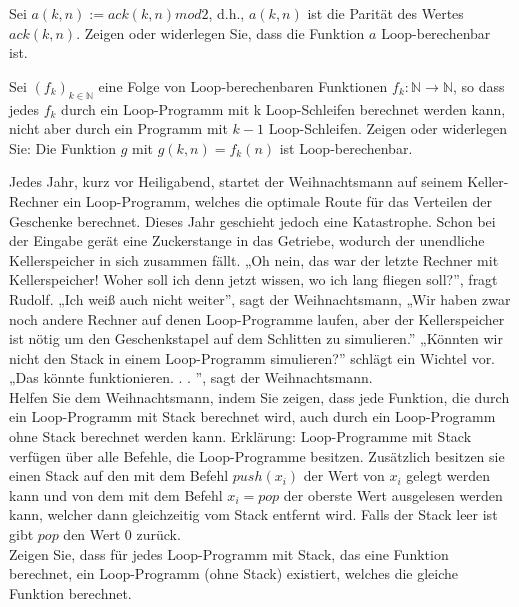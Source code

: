 \documentclass[10pt, a4paper]{exam}
\begin{document}
\begin{questions}
    \question Sei $a(k,n) := ack(k, n) mod 2$, d.h., $a(k, n)$ ist die Parität des Wertes $ack(k, n)$. Zeigen oder widerlegen Sie, dass die Funktion $a$ Loop-berechenbar ist.
    \begin{solution}
    \end{solution}

    \question Sei $(f_k)_{k\in\mathbb{N}}$ eine Folge von Loop-berechenbaren Funktionen $f_k:\mathbb{N}\rightarrow\mathbb{N}$, so dass jedes $f_k$ durch ein Loop-Programm mit k Loop-Schleifen berechnet werden kann, nicht aber durch ein Programm mit $k-1$ Loop-Schleifen. Zeigen oder widerlegen Sie: Die Funktion $g$ mit $g(k, n) = f_k(n)$ ist Loop-berechenbar.
    \begin{solution}
    \end{solution}

    \question Jedes Jahr, kurz vor Heiligabend, startet der Weihnachtsmann auf seinem Keller-Rechner ein Loop-Programm, welches die optimale Route für das Verteilen der Geschenke berechnet. Dieses Jahr geschieht jedoch eine Katastrophe. Schon bei der Eingabe gerät eine Zuckerstange in das Getriebe, wodurch der unendliche Kellerspeicher in sich zusammen fällt. „Oh nein, das war der letzte Rechner mit Kellerspeicher! Woher soll ich denn jetzt wissen, wo ich lang fliegen soll?”, fragt Rudolf. „Ich weiß auch nicht weiter”, sagt der Weihnachtsmann, „Wir haben zwar noch andere Rechner auf denen Loop-Programme laufen, aber der Kellerspeicher ist nötig um den Geschenkstapel auf dem Schlitten zu simulieren.” „Könnten wir nicht den Stack in einem Loop-Programm simulieren?” schlägt ein Wichtel vor. „Das könnte funktionieren. . . ”, sagt der Weihnachtsmann.\\
    Helfen Sie dem Weihnachtsmann, indem Sie zeigen, dass jede Funktion, die durch ein Loop-Programm mit Stack berechnet wird, auch durch ein Loop-Programm ohne Stack berechnet werden kann. Erklärung: Loop-Programme mit Stack verfügen über alle Befehle, die Loop-Programme besitzen. Zusätzlich besitzen sie einen Stack auf den mit dem Befehl $push(x_i)$ der Wert von $x_i$ gelegt werden kann und von dem mit dem Befehl $x_i = pop$ der oberste Wert ausgelesen werden kann, welcher dann gleichzeitig vom Stack entfernt wird. Falls der Stack leer ist gibt $pop$ den Wert $0$ zurück.\\
    Zeigen Sie, dass für jedes Loop-Programm mit Stack, das eine Funktion berechnet, ein Loop-Programm (ohne Stack) existiert, welches die gleiche Funktion berechnet.
    \begin{solution}
    \end{solution}


\end{questions}
\end{document}
